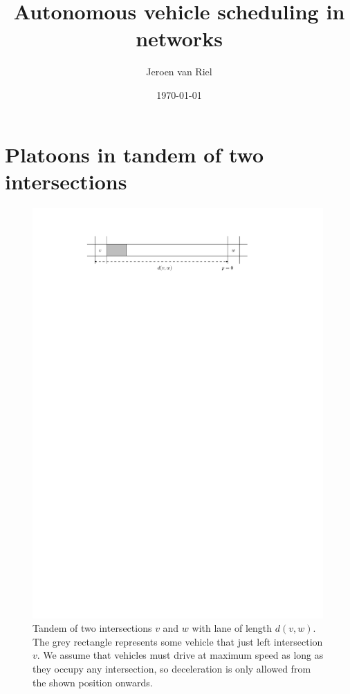 \documentclass[a4paper]{article}
\author{Jeroen van Riel}
\date{\monthyeardate\today}
\title{Autonomous vehicle scheduling in networks}
\theoremstyle{definition}
\theoremstyle{plain}
\begin{document}
\maketitle


\newcommand\halfopen[2]{\ensuremath{[#1,#2)}}
\newcommand\openhalf[2]{\ensuremath{(#1,#2]}}


\section{Platoons in tandem of two intersections}

\begin{figure}
  \centering
  \includegraphics[width=0.99\textwidth]{figures/motion/tandem}
  \caption{Tandem of two intersections $v$ and $w$ with lane of length $d(v,w)$.
    The grey rectangle represents some vehicle that just left intersection $v$.
    We assume that vehicles must drive at maximum speed as long as they occupy
    any intersection, so deceleration is only allowed from the shown position
    onwards.}
  \label{fig:tandem}
\end{figure}
\end{document}
